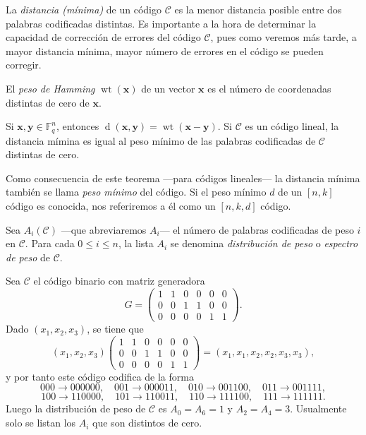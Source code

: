 La \textit{distancia (mínima)} de un código \(\mathcal C\) es la menor distancia posible entre dos palabras codificadas distintas. 
Es importante a la hora de determinar la capacidad de corrección de errores del código \(\mathcal C\), pues como veremos más tarde, a mayor distancia mínima, mayor número de errores en el código se pueden corregir.

\begin{definition}
  El \textit{peso de Hamming} \(\operatorname{wt}(\symbf{x})\) de un vector \(\symbf{x}\) es el número de coordenadas distintas de cero de \(\symbf{x}\).
\end{definition}

\begin{theorem}
  Si \(\symbf{x}, \symbf{y} \in \mathbb F_q^n\), entonces \(\operatorname{d}(\symbf{x}, \symbf{y}) = \operatorname{wt}(\symbf{x} - \symbf{y})\).
  Si \(\mathcal C\) es un código lineal, la distancia mímina es igual al peso mínimo de las palabras codificadas de \(\mathcal C\) distintas de cero.
\end{theorem}

Como consecuencia de este teorema —para códigos lineales— la distancia mínima también se llama \textit{peso mínimo} del código.
Si el peso mínimo \(d\) de un \([n,k]\) código es conocida, nos referiremos a él como un \([n,k,d]\) código.

\begin{definition}
  Sea \(A_i(\mathcal C)\) —que abreviaremos \(A_i\)— el número de palabras codificadas de peso \(i\) en \(\mathcal C\).
  Para cada \(0 \leq i \leq n\), la lista \(A_i\) se denomina \textit{distribución de peso} o \textit{espectro de peso} de \(\mathcal C\).
\end{definition}

\begin{example}
  Sea \(\mathcal C\) el código binario con matriz generadora
  \[
    G = \begin{pmatrix}
      1 & 1 & 0 & 0 & 0 & 0\\
      0 & 0 & 1 & 1 & 0 & 0 \\
      0 & 0 & 0 & 0 & 1 & 1
    \end{pmatrix}.
  \]
  Dado \((x_1, x_2, x_3)\), se tiene que \[(x_1, x_2, x_3) \begin{pmatrix}
    1 & 1 & 0 & 0 & 0 & 0\\
      0 & 0 & 1 & 1 & 0 & 0 \\
      0 & 0 & 0 & 0 & 1 & 1
  \end{pmatrix} = (x_1, x_1, x_2, x_2, x_3, x_3),\] y por tanto este código codifica de la forma 
  \[
    000 \to 000000, \quad 
    001 \to 000011,\quad 
    010 \to 001100,\quad 
    011 \to 001111,
  \]
  \[
    100 \to 110000, \quad 
    101 \to 110011,\quad 
    110 \to 111100,\quad 
    111 \to 111111.
  \]
  Luego la distribución de peso de \(\mathcal C\) es \(A_0 = A_6 = 1\) y \(A_2 = A_4 = 3\).
  Usualmente solo se listan los \(A_i\) que son distintos de cero.
\end{example}

